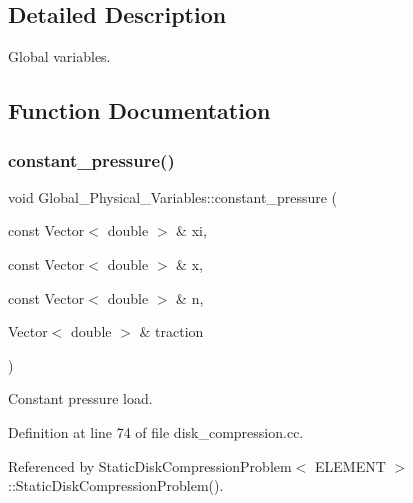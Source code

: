 \subsection{Detailed Description}
Global variables. 

\subsection{Function Documentation}
\mbox{\label{namespaceGlobal__Physical__Variables_a19f4e20a92e7d216b4d2b00308f96917}} 
\subsubsection{\texorpdfstring{constant\+\_\+pressure()}{constant\_pressure()}}
{\footnotesize\ttfamily void Global\+\_\+\+Physical\+\_\+\+Variables\+::constant\+\_\+pressure (\begin{DoxyParamCaption}\item[{const Vector$<$ double $>$ \&}]{xi,  }\item[{const Vector$<$ double $>$ \&}]{x,  }\item[{const Vector$<$ double $>$ \&}]{n,  }\item[{Vector$<$ double $>$ \&}]{traction }\end{DoxyParamCaption})}



Constant pressure load. 



Definition at line 74 of file disk\+\_\+compression.\+cc.



Referenced by Static\+Disk\+Compression\+Problem$<$ E\+L\+E\+M\+E\+N\+T $>$\+::\+Static\+Disk\+Compression\+Problem().

\mbox{\label{namespaceGlobal__Physical__Variables_a6be3760e5494b1772e4bfe5d5f3c5d53}} 
